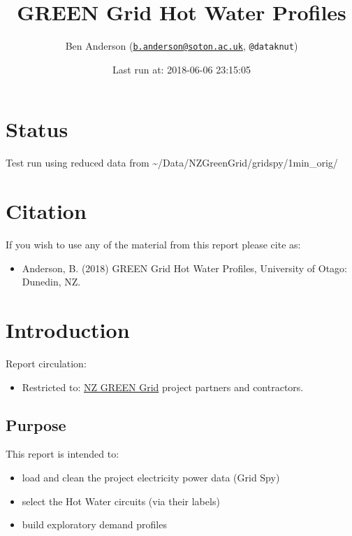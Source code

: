 \documentclass[]{article}
\title{GREEN Grid Hot Water Profiles}
\author{Ben Anderson
(\href{mailto:b.anderson@soton.ac.uk}{\nolinkurl{b.anderson@soton.ac.uk}},
\texttt{@dataknut})}
\date{Last run at: 2018-06-06 23:15:05}
\providecommand{\tightlist}{%
  \setlength{\itemsep}{0pt}\setlength{\parskip}{0pt}}
\begin{document}
\maketitle

{
\setcounter{tocdepth}{2}
\tableofcontents
}
\newpage

\section{Status}\label{status}

Test run using reduced data from
\textasciitilde{}/Data/NZGreenGrid/gridspy/1min\_orig/

\section{Citation}\label{citation}

If you wish to use any of the material from this report please cite as:

\begin{itemize}
\tightlist
\item
  Anderson, B. (2018) GREEN Grid Hot Water Profiles, University of
  Otago: Dunedin, NZ.
\end{itemize}

\newpage

\section{Introduction}\label{introduction}

Report circulation:

\begin{itemize}
\tightlist
\item
  Restricted to:
  \href{https://www.otago.ac.nz/centre-sustainability/research/energy/otago050285.html}{NZ
  GREEN Grid} project partners and contractors.
\end{itemize}

\subsection{Purpose}\label{purpose}

This report is intended to:

\begin{itemize}
\tightlist
\item
  load and clean the project electricity power data (Grid Spy)
\item
  select the Hot Water circuits (via their labels)
\item
  build exploratory demand profiles
\end{itemize}
\end{document}
